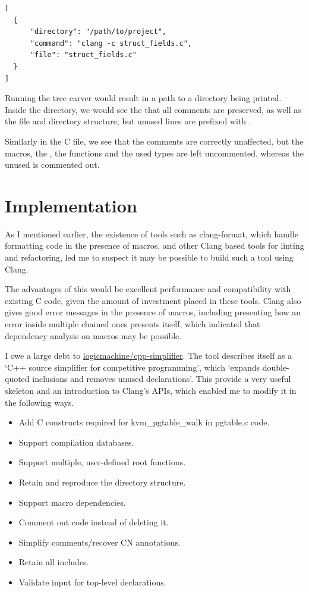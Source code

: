 \begin{verbatim}
[
  {
      "directory": "/path/to/project",
      "command": "clang -c struct_fields.c",
      "file": "struct_fields.c"
  }
]
\end{verbatim}

Running the tree carver would result in a path to a directory being printed.
Inside the directory, we would see the that all comments are preserved,
as well as the file and directory structure, but unused lines are prefixed with
\cinline{//-}.


Similarly in the C file, we see that the comments are correctly unaffected, but
the macros, the , the functions and the used types are left
uncommented, whereas the unused  is commented out.


\section{Implementation}

As I mentioned earlier, the existence of tools such as clang-format, which
handle formatting code in the presence of macros, and other Clang based tools
for linting and refactoring, led me to suspect it may be possible to build such
a tool using Clang.

The advantages of this would be excellent performance and compatibility with
existing C code, given the amount of investment placed in these tools. Clang
also gives good error messages in the presence of macros, including presenting
how an error inside multiple chained ones presents itself, which indicated that
dependency analysis on macros may be possible.

I owe a large debt to
\href{https://github.com/logicmachine/cpp-simplifier}{logicmachine/cpp-simplifier}.
The tool describes itself as a `C++ source simplifier for competitive programming',
which `expands double-quoted inclusions and removes unused declarations'.
This provide a very useful skeleton and an introduction to Clang's APIs, which
enabled me to modify it in the following ways.
\begin{itemize}
    \item Add C constructs required for kvm\_pgtable\_walk in pgtable.c code.
    \item Support compilation databases.
    \item Support multiple, user-defined root functions.
    \item Retain and reproduce the directory structure.
    \item Support macro dependencies.
    \item Comment out code instead of deleting it.
    \item Simplify comments/recover CN annotations.
    \item Retain all includes.
    \item Validate input for top-level declarations.
\end{itemize}

